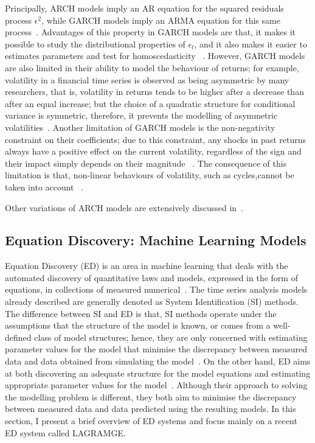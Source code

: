 \documentclass[13pt]{report}
\begin{document}
Principally, ARCH models imply an AR equation for the squared residuals process $\epsilon^{2}$, while GARCH models imply an ARMA equation for this same process~\cite{satchell2011forecasting}. Advantages of this property in GARCH models are that, it makes it possible to study the distributional properties of $\epsilon_{t}$, and it also makes it easier to estimates parameters and test for homoscedasticity ~\cite{satchell2011forecasting}. However, GARCH models are also limited in their ability to model the behaviour of returns; for example, volatility in a financial time series is observed as being asymmetric by many researchers, that is, volatility in returns tends to be higher after a decrease than after an equal increase; but the choice of a quadratic structure for conditional variance is symmetric, therefore, it prevents the modelling of asymmetric volatilities~\cite{satchell2011forecasting}. Another limitation of GARCH models is the non-negativity constraint on their coefficients; due to this constraint, any shocks in past returns always have a positive effect on the current volatility, regardless of the sign and their impact simply depends on their magnitude ~\cite{satchell2011forecasting}. The consequence of this limitation is that, non-linear behaviours of volatility, such as cycles,cannot be taken into account ~\cite{satchell2011forecasting}.\par

Other variations of ARCH models are extensively discussed in~\cite{satchell2011forecasting}.


\subsection{Equation Discovery: Machine Learning Models}
Equation Discovery (ED) is an area in machine learning that deals with the automated discovery of quantitative laws and models, expressed in the form of equations, in collections of measured numerical~\cite{datade2003machine}. The time series analysis models already described are generally denoted as System Identification (SI) methods. The difference between SI and ED is that, SI methods operate under the assumptions that the structure of the model is known, or comes from a well-defined class of model structures; hence, they are only concerned with estimating parameter values for the model that minimise the discrepancy between measured data and data obtained from simulating the model~\cite{sammut2011encyclopedia}. On the other hand, ED aims at both discovering an adequate structure for the model equations and estimating appropriate parameter values for the model~\cite{sammut2011encyclopedia}. Although their approach to solving the modelling problem is different, they both aim to minimise the discrepancy between measured data and data predicted using the resulting models. In this section, I present a brief overview of ED systems and focus mainly on a recent ED system called LAGRAMGE.
\end{document}
